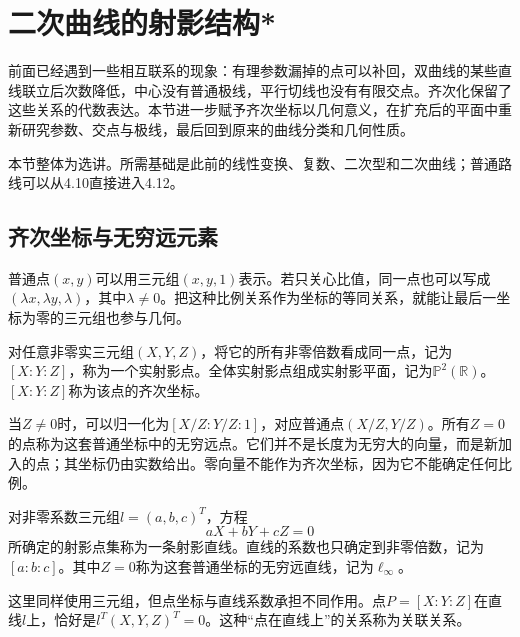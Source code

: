 \newpage
\section{二次曲线的射影结构*}
\label{sec:quadratic-projective-structure}

前面已经遇到一些相互联系的现象：有理参数漏掉的点可以补回，双曲线的某些直线联立后次数降低，中心没有普通极线，平行切线也没有有限交点。齐次化保留了这些关系的代数表达。本节进一步赋予齐次坐标以几何意义，在扩充后的平面中重新研究参数、交点与极线，最后回到原来的曲线分类和几何性质。

本节整体为选讲。所需基础是此前的线性变换、复数、二次型和二次曲线；普通路线可以从4.10直接进入4.12。

\subsection{齐次坐标与无穷远元素}
\label{subsec:quadratic-homogeneous-coordinates}

普通点\((x,y)\)可以用三元组\((x,y,1)\)表示。若只关心比值，同一点也可以写成\((\lambda x,\lambda y,\lambda)\)，其中\(\lambda\ne0\)。把这种比例关系作为坐标的等同关系，就能让最后一坐标为零的三元组也参与几何。

\begin{definition}
对任意非零实三元组\((X,Y,Z)\)，将它的所有非零倍数看成同一点，记为\([X:Y:Z]\)，称为一个{\heiti{}实射影点}。全体实射影点组成{\heiti{}实射影平面}，记为\(\mathbb P^2(\mathbb R)\)。\([X:Y:Z]\)称为该点的{\heiti{}齐次坐标}。
\end{definition}

当\(Z\ne0\)时，可以归一化为\([X/Z:Y/Z:1]\)，对应普通点\((X/Z,Y/Z)\)。所有\(Z=0\)的点称为这套普通坐标中的{\heiti{}无穷远点}。它们并不是长度为无穷大的向量，而是新加入的点；其坐标仍由实数给出。零向量不能作为齐次坐标，因为它不能确定任何比例。

\begin{definition}
对非零系数三元组\(l=(a,b,c)^T\)，方程
\begin{equation}\label{eq:quadratic-projective-line}
 aX+bY+cZ=0
\end{equation}
所确定的射影点集称为一条{\heiti{}射影直线}。直线的系数也只确定到非零倍数，记为\([a:b:c]\)。其中\(Z=0\)称为这套普通坐标的{\heiti{}无穷远直线}，记为\(\ell_\infty\)。
\end{definition}

这里同样使用三元组，但点坐标与直线系数承担不同作用。点\(P=[X:Y:Z]\)在直线\(l\)上，恰好是\(l^T(X,Y,Z)^T=0\)。这种“点在直线上”的关系称为{\heiti{}关联关系}。


